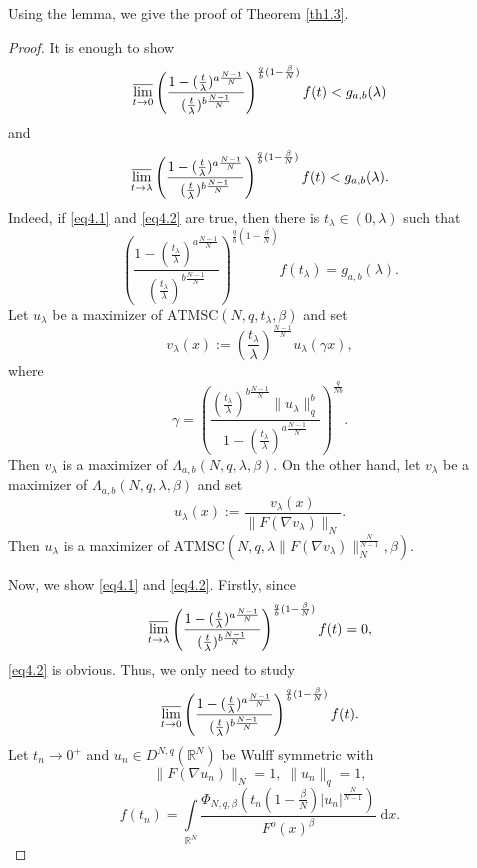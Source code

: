 \documentclass[11pt]{article}
\theoremstyle{plain}
\numberwithin{equation}{section}
\newcommand{\R}{\mathbb{R}}
\begin{document}
Using the lemma, we give the proof of Theorem \ref{th1.3}.
\begin{proof}
It is enough to show
\begin{align}\label{eq4.1}
    \varlimsup\limits_{t\rightarrow0}\left(\frac{1-(\frac{t}{\lambda})^{a\frac{N-1}{N}}}{(\frac{t}{\lambda})^{b\frac{N-1}{N}}}\right)^{\frac{q}{b}(1-\frac{\beta}{N})}f(t)<g_{a,b}(\lambda)
\end{align}
and
\begin{align}\label{eq4.2}
    \varlimsup\limits_{t\rightarrow\lambda}\left(\frac{1-(\frac{t}{\lambda})^{a\frac{N-1}{N}}}{(\frac{t}{\lambda})^{b\frac{N-1}{N}}}\right)^{\frac{q}{b}(1-\frac{\beta}{N})}f(t)<g_{a,b}(\lambda).
\end{align}
Indeed, if \eqref{eq4.1} and \eqref{eq4.2} are true, then there is $t_{\lambda}\in(0,\lambda)$ such that
$$
\left(\frac{1-(\frac{t_{\lambda}}{\lambda})^{a\frac{N-1}{N}}}{(\frac{t_{\lambda}}{\lambda})^{b\frac{N-1}{N}}}\right)^{\frac{q}{b}(1-\frac{\beta}{N})}f(t_{\lambda})=g_{a,b}(\lambda).
$$
Let $u_{\lambda}$ be a maximizer of $\mathrm{ATMSC}(N,q,t_{\lambda},\beta)$ and set
$$
v_{\lambda}(x):=\left(\frac{t_{\lambda}}{\lambda}\right)^{\frac{N-1}{N}}u_{\lambda}(\gamma x),
$$
where
$$
\gamma=\left(\frac{(\frac{t_{\lambda}}{\lambda})^{b\frac{N-1}{N}}\|u_{\lambda}\|_{q}^{b}}{1-(\frac{t_{\lambda}}{\lambda})^{a\frac{N-1}{N}}}\right)^{\frac{q}{Nb}}.
$$
Then $v_{\lambda}$ is a maximizer of $\Lambda_{a,b}(N,q,\lambda,\beta)$. On the other hand, let $v_{\lambda}$ be a maximizer of $\Lambda_{a,b}(N,q,\lambda,\beta)$ and set
$$
u_{\lambda}(x):=\frac{v_{\lambda}(x)}{\|F(\nabla v_{\lambda})\|_{N}}.
$$
Then $u_{\lambda}$ is a maximizer of $\mathrm{ATMSC}(N,q,\lambda\|F(\nabla v_{\lambda})\|_{N}^{\frac{N}{N-1}},\beta)$.

Now, we show \eqref{eq4.1} and \eqref{eq4.2}. Firstly, since
$$
\varlimsup\limits_{t\rightarrow\lambda}\left(\frac{1-(\frac{t}{\lambda})^{a\frac{N-1}{N}}}{(\frac{t}{\lambda})^{b\frac{N-1}{N}}}\right)^{\frac{q}{b}(1-\frac{\beta}{N})}f(t)=0,
$$
\eqref{eq4.2} is obvious. Thus, we only need to study
$$
\varlimsup\limits_{t\rightarrow0}\left(\frac{1-(\frac{t}{\lambda})^{a\frac{N-1}{N}}}{(\frac{t}{\lambda})^{b\frac{N-1}{N}}}\right)^{\frac{q}{b}(1-\frac{\beta}{N})}f(t).
$$
Let $t_{n}\rightarrow0^{+}$ and $u_{n}\in D^{N,q}(\R^{N})$ be Wulff symmetric with
$$
\|F(\nabla u_{n})\|_{N}=1,\;\|u_{n}\|_{q}=1,
$$
$$
f(t_{n})=\int\limits_{\R^{N}}\frac{\Phi_{N,q,\beta}(t_{n}(1-\frac{\beta}{N})\lvert u_{n}\rvert^{\frac{N}{N-1}})}{F^{o}(x)^{\beta}}\;\mathrm{d}x.
$$


\end{proof}
\end{document}
